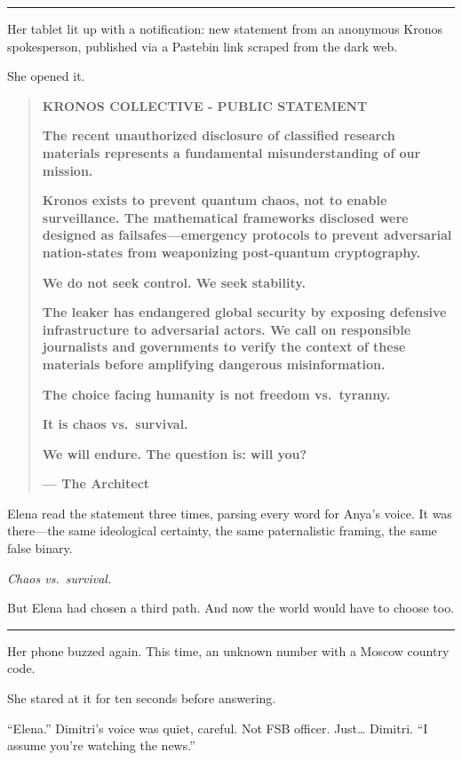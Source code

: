 \begin{center}\rule{0.5\linewidth}{0.5pt}\end{center}

Her tablet lit up with a notification: new statement from an anonymous Kronos spokesperson, published via a Pastebin link scraped from the dark web.

She opened it.

\begin{quote}
\textbf{KRONOS COLLECTIVE - PUBLIC STATEMENT}

\textbf{The recent unauthorized disclosure of classified research materials represents a fundamental misunderstanding of our mission.}

\textbf{Kronos exists to prevent quantum chaos, not to enable surveillance. The mathematical frameworks disclosed were designed as failsafes---emergency protocols to prevent adversarial nation-states from weaponizing post-quantum cryptography.}

\textbf{We do not seek control. We seek stability.}

\textbf{The leaker has endangered global security by exposing defensive infrastructure to adversarial actors. We call on responsible journalists and governments to verify the context of these materials before amplifying dangerous misinformation.}

\textbf{The choice facing humanity is not freedom vs.~tyranny.}

\textbf{It is chaos vs.~survival.}

\textbf{We will endure. The question is: will you?}

\textbf{--- The Architect}
\end{quote}

Elena read the statement three times, parsing every word for Anya's voice. It was there---the same ideological certainty, the same paternalistic framing, the same false binary.

\emph{Chaos vs.~survival.}

But Elena had chosen a third path. And now the world would have to choose too.

\begin{center}\rule{0.5\linewidth}{0.5pt}\end{center}

Her phone buzzed again. This time, an unknown number with a Moscow country code.

She stared at it for ten seconds before answering.

``Elena.'' Dimitri's voice was quiet, careful. Not FSB officer. Just\ldots{} Dimitri. ``I assume you're watching the news.''

